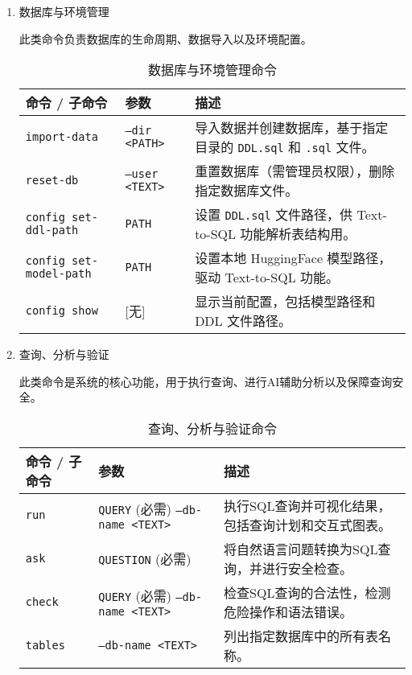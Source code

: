 \begin{CJK*}{UTF8}{song}
\begin{enumerate}
    \item 数据库与环境管理
    
    此类命令负责数据库的生命周期、数据导入以及环境配置。
    \begin{table}[H]
    \centering
    \caption{数据库与环境管理命令}
    \vspace{2mm}
    \small
    \begin{tabular}{p{2cm}p{2cm}p{3cm}}
    \toprule
    \textbf{命令 / 子命令} & \textbf{参数} & \textbf{描述} \\
    \hline
    \texttt{import-data} & \texttt{--dir <PATH>} & 导入数据并创建数据库，基于指定目录的 \texttt{DDL.sql} 和 \texttt{.sql} 文件。 \\
    \texttt{reset-db} & \texttt{--user <TEXT>} & 重置数据库（需管理员权限），删除指定数据库文件。\\
    \texttt{config set-ddl-path} & \texttt{PATH} & 设置 \texttt{DDL.sql} 文件路径，供 Text-to-SQL 功能解析表结构用。 \\
    \texttt{config set-model-path} & \texttt{PATH} & 设置本地 HuggingFace 模型路径，驱动 Text-to-SQL 功能。 \\
    \texttt{config show} & [无] & 显示当前配置，包括模型路径和 DDL 文件路径。 \\
    \bottomrule
    \end{tabular}
    \label{tab1}
    \end{table}

    \item 查询、分析与验证
    
    此类命令是系统的核心功能，用于执行查询、进行AI辅助分析以及保障查询安全。
    \begin{table}[H]
    \centering
    \caption{查询、分析与验证命令}
    \vspace{2mm}
    \small
    \begin{tabular}{lp{2cm}p{3cm}}
    \toprule
    \textbf{命令 / 子命令} & \textbf{参数} & \textbf{描述} \\
    \hline
    \texttt{run} & \texttt{QUERY} (必需) \newline \texttt{--db-name <TEXT>} & 执行SQL查询并可视化结果，包括查询计划和交互式图表。 \\
    \texttt{ask} & \texttt{QUESTION} (必需) & 将自然语言问题转换为SQL查询，并进行安全检查。 \\
    \texttt{check} & \texttt{QUERY} (必需) \newline \texttt{--db-name <TEXT>} & 检查SQL查询的合法性，检测危险操作和语法错误。 \\
    \texttt{tables} & \texttt{--db-name <TEXT>} & 列出指定数据库中的所有表名称。 \\
    \bottomrule
    \end{tabular}
    \label{tab2}
    \end{table}


\end{enumerate}
\end{CJK*}
